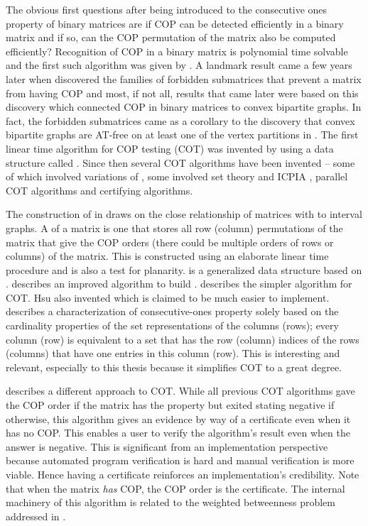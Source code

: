The obvious first questions after being introduced to the consecutive
ones property of binary matrices are if COP can be detected
efficiently in a binary matrix and if so, can the COP permutation of
the matrix also be computed efficiently?  Recognition of COP in a
binary matrix is polynomial time solvable and the first such algorithm
was given by \cite{fg65}.  A landmark result came a few years later
when \cite{at72} discovered the families of forbidden submatrices that
prevent a matrix from having COP and most, if not all, results that
came later were based on this discovery which connected COP in binary
matrices to convex bipartite graphs. In fact, the forbidden
submatrices came as a corollary to the discovery that convex bipartite
graphs are AT-free on at least one of the vertex partitions in
\cite{at72}. The first linear time algorithm for COP testing (COT) was
invented by \cite{bl76} using a data structure called \PQtrees.  Since
then several COT algorithms have been invented -- some of which
involved variations of \PQtrees \cite{mm96,wlh01,mcc04}, some involved
set theory and ICPIA \cite{wlh02,nsnrs09}, parallel COT
algorithms\cite{as95,bs03,ly91} and certifying algorithms\cite{mcc04}.

The construction of \PQtrees in \cite{bl76} draws on the close
relationship of matrices with \COP to interval graphs. A \PQtree of a
matrix is one that stores all row (column) permutations of the matrix
that give the COP orders (there could be multiple orders of rows or
columns) of the matrix. This is constructed using an elaborate linear
time procedure and is also a test for planarity.  \PQRtree is a
generalized data structure based on \PQtrees \cite{mm96,mpt98}.
\cite{tm05} describes an improved algorithm to build
\PQRtrees. \cite{wlh02} describes the simpler algorithm for COT. Hsu
also invented \PCtrees \cite{wlh01} which is claimed to be much easier
to implement. \cite{nsnrs09} describes a characterization of
consecutive-ones property solely based on the cardinality properties
of the set representations of the columns (rows); every column (row)
is equivalent to a set that has the row (column) indices of the rows
(columns) that have one entries in this column (row). This is
interesting and relevant, especially to this thesis because it
simplifies COT to a great degree.

\cite{mcc04} describes a different approach to COT. While all previous
COT algorithms gave the COP order if the matrix has the property but
exited stating negative if otherwise, this algorithm gives an evidence
by way of a certificate even when it has no COP. This enables a user
to verify the algorithm's result even when the answer is
negative. This is significant from an implementation perspective
because automated program verification is hard and manual verification
is more viable. Hence having a certificate reinforces an
implementation's credibility. Note that when the matrix {\em has} COP,
the COP order is the certificate.  The internal machinery of this
algorithm is related to the weighted betweenness problem addressed in
\cite{co98}.

